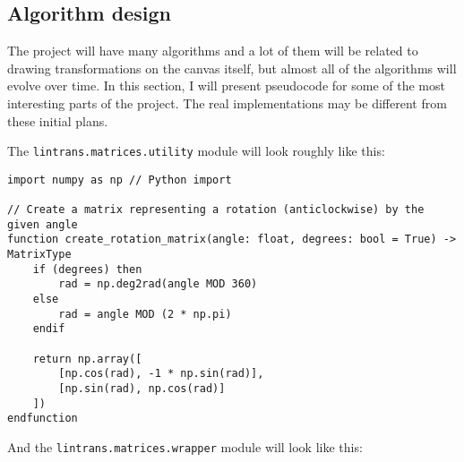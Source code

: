 \documentclass[../main.tex]{subfiles}
\begin{document}
\subsection{Algorithm design\label{design:algorithm-design}}

The project will have many algorithms and a lot of them will be related to drawing transformations on the canvas itself, but almost all of the algorithms will evolve over time. In this section, I will present pseudocode for some of the most interesting parts of the project. The real implementations may be different from these initial plans.

The \texttt{lintrans.matrices.utility} module will look roughly like this:

\begin{verbatim}
import numpy as np // Python import

// Create a matrix representing a rotation (anticlockwise) by the given angle
function create_rotation_matrix(angle: float, degrees: bool = True) -> MatrixType
	if (degrees) then
		rad = np.deg2rad(angle MOD 360)
	else
		rad = angle MOD (2 * np.pi)
	endif

	return np.array([
		[np.cos(rad), -1 * np.sin(rad)],
		[np.sin(rad), np.cos(rad)]
	])
endfunction
\end{verbatim}

And the \texttt{lintrans.matrices.wrapper} module will look like this:
\end{document}
